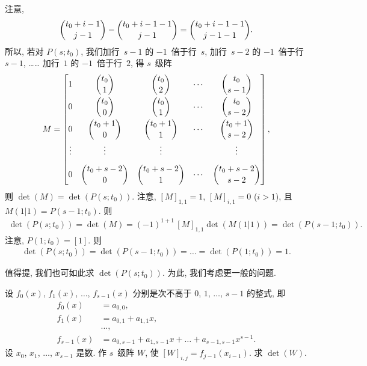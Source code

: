 \documentclass[../libro.tex]{subfiles}
\begin{document}
\begin{example}
    注意,
    \begin{equation}
        \dbinom{t_0+i-1}{j-1} - \dbinom{t_0+i-1-1}{j-1}
        = \dbinom{t_0+i-1-1}{j-1-1}.
        \label{eq:ff-identity-of-Yang-Hui}
    \end{equation}
    所以, 若对 \(P(s; t_0)\),
    我们加行~\(s-1\) 的 \(-1\)~倍于行~\(s\),
    加行~\(s-2\) 的 \(-1\)~倍于行~\(s-1\),
    ……
    加行~\(1\) 的 \(-1\)~倍于行~\(2\),
    得 \(s\)~级阵
    \begin{align*}
        M =
        \begin{bmatrix}
            1      & \dbinom{t_0}{1}     & \dbinom{t_0}{2}     & \cdots & \dbinom{t_0}{s-1}     \\[2ex]
            0      & \dbinom{t_0}{0}     & \dbinom{t_0}{1}     & \cdots & \dbinom{t_0}{s-2}     \\[2ex]
            0      & \dbinom{t_0+1}{0}   & \dbinom{t_0+1}{1}   & \cdots & \dbinom{t_0+1}{s-2}   \\[2ex]
            \vdots & \vdots              & \vdots              & {}     & \vdots                \\[2ex]
            0      & \dbinom{t_0+s-2}{0} & \dbinom{t_0+s-2}{1} & \cdots & \dbinom{t_0+s-2}{s-2} \\
        \end{bmatrix},
    \end{align*}
    则 \(\det {(M)} = \det {(P(s; t_0))}\).
    注意, \([M]_{1,1} = 1\),
    \([M]_{i,1} = 0\) (\(i > 1\)),
    且 \(M(1|1) = P(s-1; t_0)\).
    则
    \begin{align*}
        \det {(P(s; t_0))}
        = \det {(M)}
        = (-1)^{1+1}\, [M]_{1,1} \det {(M(1|1))}
        = \det {(P(s-1; t_0))}.
    \end{align*}
    注意, \(P(1; t_0) = [1]\).
    则
    \begin{align*}
        \det {(P(s; t_0))} = \det {(P(s-1; t_0))}
        = \dots = \det {(P(1; t_0))} = 1.
    \end{align*}

    值得提, 我们也可如此求 \(\det {(P(s; t_0))}\).
    为此, 我们考虑更一般的问题.

    设 \(f_0 (x)\), \(f_1 (x)\), \(\dots\), \(f_{s-1} (x)\)
    分别是次不高于 \(0\), \(1\), \(\dots\), \(s-1\) 的整式,
    即
    \begin{align*}
        f_0 (x) & = a_{0,0}, \\
        f_1 (x) & = a_{0,1} + a_{1,1} x, \\
        & \dots, \\
        f_{s-1} (x) & = a_{0,s-1} + a_{1,s-1} x + \dots + a_{s-1,s-1} x^{s-1}.
    \end{align*}
    设 \(x_0\), \(x_1\), \(\dots\), \(x_{s-1}\) 是数.
    作 \(s\)~级阵 \(W\), 使 \([W]_{i,j} = f_{j-1} (x_{i-1})\).
    求 \(\det {(W)}\).


\end{example}
\end{document}
